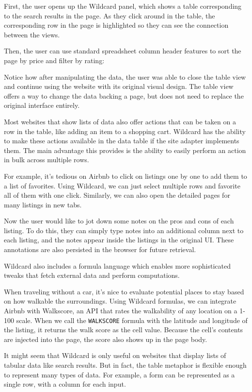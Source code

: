 \documentclass[english,submission]{programming}
\begin{document}
First, the user opens up the Wildcard panel, which shows a table
corresponding to the search results in the page. As they click around in
the table, the corresponding row in the page is highlighted so they can
see the connection between the views.

Then, the user can use standard spreadsheet column header features to
sort the page by price and filter by rating:

Notice how after manipulating the data, the user was able to close the
table view and continue using the website with its original visual
design. The table view offers a way to change the data backing a page,
but does not need to replace the original interface entirely.

Most websites that show lists of data also offer actions that can be
taken on a row in the table, like adding an item to a shopping cart.
Wildcard has the ability to make these actions available in the data
table if the site adapter implements them. The main advantage this
provides is the ability to easily perform an action in bulk across
multiple rows.

For example, it's tedious on Airbnb to click on listings one by one to
add them to a list of favorites. Using Wildcard, we can just select
multiple rows and favorite all of them with one click. Similarly, we can
also open the detailed pages for many listings in new tabs.

Now the user would like to jot down some notes on the pros and cons of
each listing. To do this, they can simply type notes into an additional
column next to each listing, and the notes appear inside the listings in
the original UI. These annotations are also persisted in the browser for
future retrieval.

Wildcard also includes a formula language which enables more
sophisticated tweaks that fetch external data and perform computations.

When traveling without a car, it's nice to evaluate potential places to
stay based on how walkable the surroundings. Using Wildcard formulas, we
can integrate Airbnb with Walkscore, an API that rates the walkability
of any location on a 1-100 scale. When we call the \texttt{WALKSCORE}
formula with the latitude and longitude of the listing, it returns the
walk score as the cell value. Because the cell's contents are injected
into the page, the score also shows up in the page body.

It might seem that Wildcard is only useful on websites that display
lists of tabular data like search results. But in fact, the table
metaphor is flexible enough to represent many types of data. For
example, a form can be represented as a single row, with a column for
each input.
\end{document}
